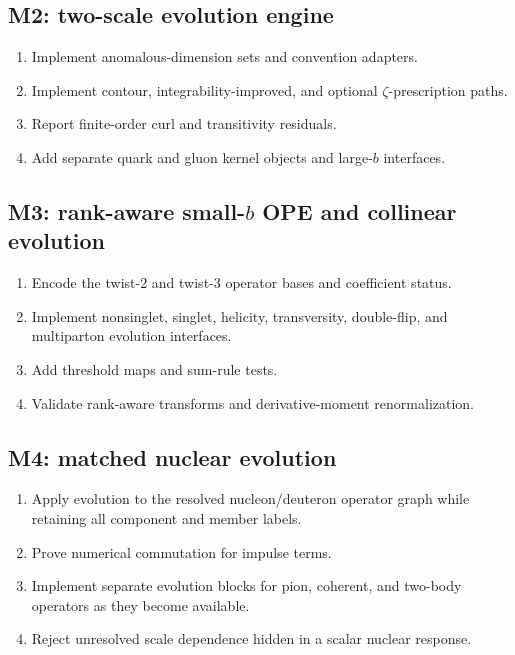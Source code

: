 \documentclass[11pt]{article}
\begin{document}
\subsection{M2: two-scale evolution engine}

\begin{enumerate}
\item Implement anomalous-dimension sets and convention adapters.
\item Implement contour, integrability-improved, and optional
      \(\zeta\)-prescription paths.
\item Report finite-order curl and transitivity residuals.
\item Add separate quark and gluon kernel objects and large-\(b\) interfaces.
\end{enumerate}

\subsection{M3: rank-aware small-\texorpdfstring{\(b\)}{b} OPE and collinear evolution}

\begin{enumerate}
\item Encode the twist-2 and twist-3 operator bases and coefficient status.
\item Implement nonsinglet, singlet, helicity, transversity, double-flip, and
      multiparton evolution interfaces.
\item Add threshold maps and sum-rule tests.
\item Validate rank-aware transforms and derivative-moment renormalization.
\end{enumerate}

\subsection{M4: matched nuclear evolution}

\begin{enumerate}
\item Apply evolution to the resolved nucleon/deuteron operator graph while
      retaining all component and member labels.
\item Prove numerical commutation for impulse terms.
\item Implement separate evolution blocks for pion, coherent, and two-body
      operators as they become available.
\item Reject unresolved scale dependence hidden in a scalar nuclear response.
\end{enumerate}
\end{document}
